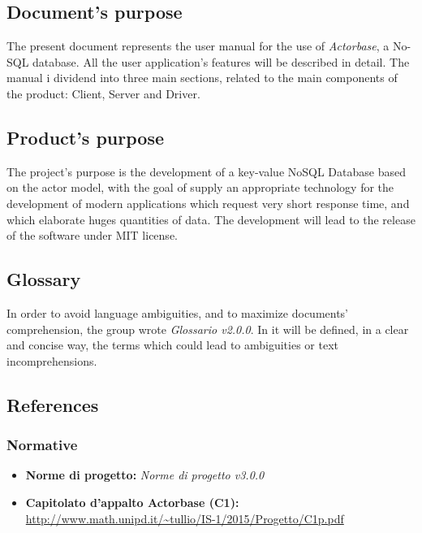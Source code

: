 \documentclass[a4paper]{article}
\begin{document}
	\subsection{Document's purpose}
		The present document represents the user manual for the use of \emph{Actorbase}, a No-SQL database. All the user application's features will be described in detail. The manual i dividend into three main sections, related to the main components of the product: Client, Server and Driver.
	\subsection{Product's purpose}
		The project's purpose is the development of a key-value NoSQL Database based on the actor model, with the goal of supply an appropriate technology for the development of modern applications which request very short response time, and which elaborate huges quantities of data. The development will lead to the release of the software under MIT license.
	\subsection{Glossary}
		In order to avoid language ambiguities, and to maximize documents' comprehension, the group wrote \emph{Glossario v2.0.0}. In it will be defined, in a clear and concise way, the terms which could lead to ambiguities or text incomprehensions.
	\subsection{References}
	\subsubsection{Normative}
		\begin{itemize}
			\item \textbf{Norme di progetto:} \emph{Norme di progetto v3.0.0}
			\item \textbf{Capitolato d'appalto Actorbase (C1):} \\ 
			\url{http://www.math.unipd.it/~tullio/IS-1/2015/Progetto/C1p.pdf}
		\end{itemize}
	\newpage
\end{document}
